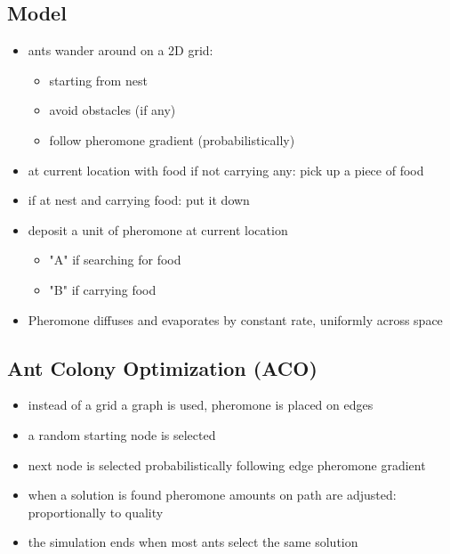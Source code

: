 \documentclass[a4paper,12pt,answers]{article}
\begin{document}
	\subsection{Model}
	\begin{itemize}
		\item ants wander around on a 2D grid:
		\begin{itemize}
			\item starting from nest
			\item avoid obstacles (if any)
			\item follow pheromone gradient (probabilistically)
		\end{itemize}
		\item at current location with food if not carrying any: pick up a piece of food
		\item if at nest and carrying food: put it down 
		\item deposit a unit of pheromone at current location
		\begin{itemize}
			\item "A" if searching for food
			\item "B" if carrying food
		\end{itemize}
		\item Pheromone diffuses and evaporates by constant rate, uniformly across space
	\end{itemize}

	
	\subsection{Ant Colony Optimization (ACO)}
	\begin{itemize}
		\item instead of a grid a graph is used, pheromone is placed on edges
		\item a random starting node is selected
		\item next node is selected probabilistically following edge pheromone gradient
		\item when a solution is found pheromone amounts on path are adjusted: proportionally to quality
		\item the simulation ends when most ants select the same solution 
	\end{itemize}
	
	
	
	\newpage
\end{document}

